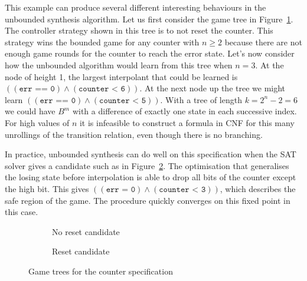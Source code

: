 This example can produce several different interesting behaviours in the unbounded synthesis algorithm. Let us first consider the game tree in Figure~\ref{fig:limitationAGTa}. The controller strategy shown in this tree is to not reset the counter. This strategy wins the bounded game for any counter with $n \geq 2$ because there are not enough game rounds for the counter to reach the error state. Let's now consider how the unbounded algorithm would learn from this tree when $n = 3$. At the node of height 1, the largest interpolant that could be learned is $((\texttt{err == 0}) \land (\texttt{counter < 6}))$. At the next node up the tree we might learn $((\texttt{err == 0}) \land (\texttt{counter < 5}))$. With a tree of length $k = 2^n - 2 = 6$ we could have $B^m$ with a difference of exactly one state in each successive index. For high values of $n$ it is infeasible to construct a formula in CNF for this many unrollings of the transition relation, even though there is no branching.

In practice, unbounded synthesis can do well on this specification when the SAT solver gives a candidate such as in Figure~\ref{fig:limitationAGTb}. The optimisation that generalises the losing state before interpolation is able to drop all bits of the counter except the high bit. This gives $((\texttt{err = 0}) \land (\texttt{counter < 3}))$, which describes the safe region of the game. The procedure quickly converges on this fixed point in this case.

\begin{figure}
    \begin{subfigure}[t]{0.5\textwidth}
        \centering
        \caption{No reset candidate}
        \label{fig:limitationAGTa}
    \end{subfigure}
    \begin{subfigure}[t]{0.5\textwidth}
        \centering
        \caption{Reset candidate}
        \label{fig:limitationAGTb}
    \end{subfigure}
    \caption{Game trees for the counter specification}
    \label{fig:limitationAGT}
\end{figure}


